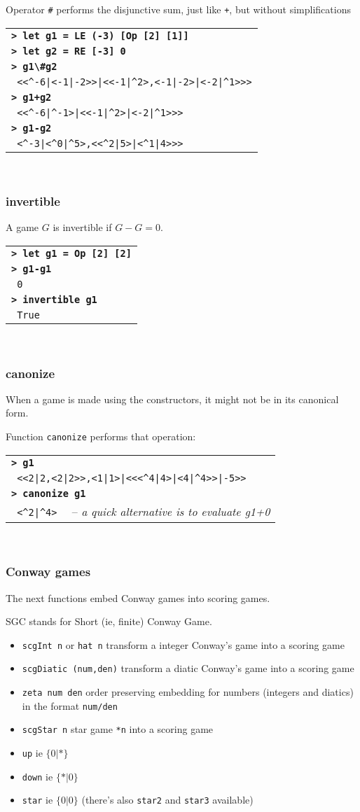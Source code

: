 \documentclass[a4paper,12pt]{article}
\newcommand{\bash}[1]{\small\textbf{\lstinline§> #1§}\\}
\newcommand{\out}[1]{\small\lstinline§ #1§}
\newcommand{\hsklcmt}[1]{~~-- \footnotesize\textit{#1}}
\newcommand{\haskellCode}{\fontfamily{pcr}\selectfont}
\newenvironment{sgcode}
	{ \haskellCode
	  \begin{tabular}{|p{0.9\textwidth}|}
      \hline	
	}
	{ \\\hline  
      \end{tabular} \\
	  \par 
	}
\begin{document}
Operator \verb|#| performs the disjunctive sum, just like \verb|+|, but without simplifications

\begin{sgcode}
\bash{let g1 = LE (-3) [Op [2] [1]]}
\bash{let g2 = RE [-3] 0}
\bash{g1\#g2}
\out{<<^-6|<-1|-2>>|<<-1|^2>,<-1|-2>|<-2|^1>>>} \\
\bash{g1+g2}
\out{<<^-6|^-1>|<<-1|^2>|<-2|^1>>>} \\
\bash{g1-g2}
\out{<^-3|<^0|^5>,<<^2|5>|<^1|4>>>}
\end{sgcode}

\subsubsection{invertible}

A game $G$ is invertible if $G-G=0$.

\begin{sgcode}
\bash{let g1 = Op [2] [2]}
\bash{g1-g1}
\out{0} \\
\bash{invertible g1}
\out{True}
\end{sgcode}

\subsubsection{canonize}

When a game is made using the constructors, it might not be in its canonical form. 

Function \verb!canonize! performs that operation:

\begin{sgcode}
\bash{g1}
\out{<<2|2,<2|2>>,<1|1>|<<<^4|4>|<4|^4>>|-5>>} \\
\bash{canonize g1}
\out{<^2|^4>} \hsklcmt{a quick alternative is to evaluate g1+0}
\end{sgcode}

\subsubsection{Conway games}

The next functions embed Conway games into scoring games.

SGC stands for Short (ie, finite) Conway Game.

\begin{itemize} \setlength\itemsep{0.1em}
  \item \verb|scgInt n| or \verb|hat n| transform a integer Conway's game into a scoring game
  \item \verb|scgDiatic (num,den)| transform a diatic Conway's game into a scoring game
  \item \verb|zeta num den| order preserving embedding for numbers (integers and diatics) in the format \verb|num/den|
  \item \verb|scgStar n| star game \verb|*n| into a scoring game
  \item \verb|up| ie $\{0|*\}$
  \item \verb|down| ie $\{*|0\}$
  \item \verb|star| ie $\{0|0\}$ (there's also \verb|star2| and \verb|star3| available)
\end{itemize}
\end{document}
